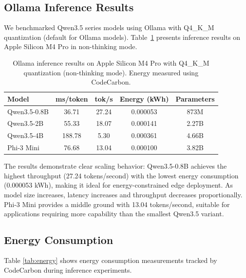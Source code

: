 \documentclass[11pt,a4paper]{article}
\begin{document}
\subsection{Ollama Inference Results}

We benchmarked Qwen3.5 series models using Ollama with Q4\_K\_M quantization (default for Ollama models). Table~\ref{tab:ollama_results} presents inference results on Apple Silicon M4 Pro in non-thinking mode.

\begin{table}[t]
\centering
\caption{Ollama inference results on Apple Silicon M4 Pro with Q4\_K\_M quantization (non-thinking mode). Energy measured using CodeCarbon.}
\label{tab:ollama_results}
\begin{tabular}{l|cccc}
\toprule
\textbf{Model} & \textbf{ms/token} & \textbf{tok/s} & \textbf{Energy (kWh)} & \textbf{Parameters} \\
\midrule
Qwen3.5-0.8B & 36.71 & 27.24 & 0.000053 & 873M \\
Qwen3.5-2B & 55.33 & 18.07 & 0.000141 & 2.27B \\
Qwen3.5-4B & 188.78 & 5.30 & 0.000361 & 4.66B \\
Phi-3 Mini & 76.68 & 13.04 & 0.000100 & 3.82B \\
\bottomrule
\end{tabular}
\end{table}
The results demonstrate clear scaling behavior: Qwen3.5-0.8B achieves the highest throughput (27.24 tokens/second) with the lowest energy consumption (0.000053 kWh), making it ideal for energy-constrained edge deployment. As model size increases, latency increases and throughput decreases proportionally. Phi-3 Mini provides a middle ground with 13.04 tokens/second, suitable for applications requiring more capability than the smallest Qwen3.5 variant.


\subsection{Energy Consumption}

Table \ref{tab:energy} shows energy consumption measurements tracked by CodeCarbon during inference experiments.
\end{document}
